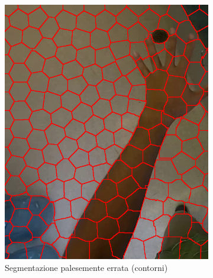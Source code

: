 \documentclass[12pt,a4paper,oneside]{article}
\begin{document}
\begin{figure}[!htb]
\begin{subfigure}[t]{.325\textwidth}
		\includegraphics[width=\textwidth]{resources/images/drifting1100a.png}
		\captionsetup{justification=centering}
		\caption{Segmentazione palesemente errata (contorni)}\label{es_drifting_1100a}
	\end{subfigure}%
	\hfill
	\begin{subfigure}[t]{.325\textwidth}

\end{subfigure}
\end{figure}
\end{document}
